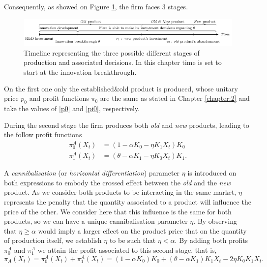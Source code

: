 Consequently, as showed on Figure \ref{3_time}, the firm faces 3 stages.

\vspace{4mm}
\begin{figure}[!htb]
	\centering
	\includegraphics[width=\textwidth]{Prob3/3_timelinet.PNG}
	\caption{Timeline representing the three possible different stages of production and associated decisions. In this chapter time is set to start at the innovation breakthrough.}
	\label{3_time}
\end{figure}
On the first one only the established\&old product is produced, whose unitary price $p_0$ and profit functions $\pi_0$ are the same as stated in Chapter \ref{chapter:2} and take the values of \eqref{p0} and \eqref{pi0}, respectively.

During the second stage the firm produces both \textit{old} and \textit{new} products, leading to the follow profit functions
\begin{align}
\pi_0^A(X_t)&=(1-\alpha K_0-\eta K_1 X_t) K_0\\
\pi_1^A(X_t)&=(\theta-\alpha K_1-\eta K_0 X_t) K_1.
\end{align}

A \textit{cannibalisation} (or\textit{ horizontal differentiation}) parameter $\eta$ is introduced on both expressions to embody the crossed effect between the \textit{old} and the \textit{new} product. As we consider both products to be interacting in the same market, $\eta$ represents the penalty that the quantity
associated to a product will influence the price of the other. We consider here
that this influence is the same for both products, so we can have a unique cannibalisation parameter $\eta$.
By observing that $\eta\geq \alpha$ would imply a larger effect on the product price that on the quantity of production itself, we establish $\eta$ to be such that $\eta < \alpha$. 
By adding both profits $\pi^A_0$ and $\pi_1^A$ we attain the profit associated to this second stage, that is,
\begin{equation}
\pi_A(X_t)=\pi_0^A(X_t)+\pi_1^A(X_t)=(1-\alpha K_0)K_0+(\theta-\alpha K_1)K_1X_t-2\eta K_0 K_1 X_t.
\end{equation}

